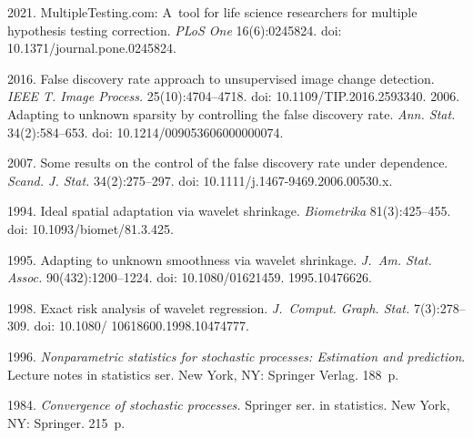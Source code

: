 





  


  \begin{multicols}{2}

\renewcommand{\bibname}{\protect\rmfamily References}

{\small\frenchspacing
 {%
 \begin{thebibliography}{9} 
 2021.
MultipleTesting.com: A~tool for life science researchers for multiple hypothesis testing correction. \textit{PLoS One} 16(6):0245824. doi: 10.1371/journal.pone.0245824.

 2016.
False discovery rate approach to unsupervised image change detection. \textit{IEEE T. Image Process.} 25(10):4704--4718. doi: 10.1109/TIP.2016.2593340.
 2006. 
Adapting to unknown sparsity by controlling the false discovery rate. \textit{Ann. Stat.} 34(2):584--653. doi: 10.1214/009053606000000074.

 2007. 
Some results on the control of the false discovery rate under dependence. \textit{Scand. J. Stat.} 34(2):275--297.
doi: 10.1111/j.1467-9469.2006.00530.x.

 1994. 
Ideal spatial adaptation via wavelet shrinkage. \textit{Biometrika} 81(3):425--455. doi: 10.1093/biomet/81.3.425.

 1995.
Adapting to unknown smoothness via wavelet shrinkage. \textit{J.~Am. Stat. Assoc.} 90(432):1200--1224. doi: 10.1080/01621459. 1995.10476626.

 1998. 
Exact risk analysis of wavelet regression. \textit{J.~Comput. Graph. Stat.} 7(3):278--309. doi: 10.1080/ 10618600.1998.10474777.

 1996.
\textit{Nonparametric statistics for stochastic processes: Estimation and prediction}. Lecture notes in statistics ser. New York, NY: Springer Verlag. 188~p.


 1984. 
\textit{Convergence of stochastic processes.} Springer ser. in statistics. New York, NY: Springer. 215~p.
\end{thebibliography}

 }
 }

\end{multicols}

